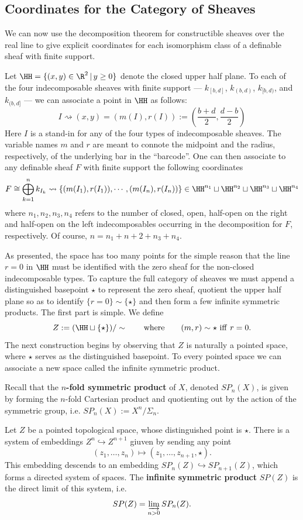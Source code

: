 \subsection{Coordinates for the Category of Sheaves}

We can now use the decomposition theorem for constructible sheaves over the real line to give explicit coordinates for each isomorphism class of a definable sheaf with finite support.

Let $\HH=\{(x,y)\in \R^2 \,|\, y\geq 0 \}$ denote the closed upper half plane. To each of the four indecomposable sheaves with finite support --- $k_{[b,d]}$, $k_{(b,d)}$, $k_{[b,d)}$, and $k_{(b,d]}$ --- we can associate a point in $\HH$ as follows:
\[
I \rightsquigarrow (x,y)=(m(I),r(I)):=(\frac{b+d}{2},\frac{d-b}{2})
\]
Here $I$ is a stand-in for any of the four types of indecomposable sheaves. The variable names $m$ and $r$ are meant to connote the midpoint and the radius, respectively, of the underlying bar in the ``barcode''. One can then associate to any definable sheaf $F$ with finite support the following coordinates
\[
F\cong \bigoplus_{k=1}^n k_{I_k}\rightsquigarrow \{(m(I_1),r(I_1)),\cdots,(m(I_n),r(I_n))\}\in \HH^{n_1} \sqcup \HH^{n_2} \sqcup \HH^{n_3} \sqcup \HH^{n_4}
\]
where $n_1,n_2,n_3,n_4$ refers to the number of closed, open, half-open on the right and half-open on the left indecomposables occurring in the decomposition for $F$, respectively. Of course, $n=n_1+n+2+n_3+n_4$. 

As presented, the space has too many points for the simple reason that the line $r=0$ in $\HH$ must be identified with the zero sheaf for the non-closed indecomposable types. To capture the full category of sheaves we must append a distinguished basepoint $\star$ to represent the zero sheaf, quotient the upper half plane so as to identify $\{r=0\}\sim \{\star\}$ and then form a few infinite symmetric products. The first part is simple. We define
\[
Z:=(\HH\sqcup \{\star\})/\sim \qquad \mathrm{where} \qquad (m,r)\sim \star \,\,\mathrm{iff}\,\, r=0.
\]
The next construction begins by observing that $Z$ is naturally a pointed space, where $\star$ serves as the distinguished basepoint. To every pointed space we can associate a new space called the infinite symmetric product.

\begin{defn}
 Recall that the \textbf{$n$-fold symmetric product} of $X$, denoted $SP_n(X)$, is given by forming the $n$-fold Cartesian product and quotienting out by the action of the symmetric group, i.e. $SP_n(X):=X^n/\Sigma_n$. 

 Let $Z$ be a pointed topological space, whose distinguished point is $\star$. There is a system of embeddings $Z^n\hookrightarrow Z^{n+1}$ giuven by sending any point 
\[
(z_1,\ldots,z_n) \mapsto (z_1,\ldots,z_{n+1},\star).
\] 
This embedding descends to an embedding $SP_n(Z)\hookrightarrow SP_{n+1}(Z)$, which forms a directed system of spaces. The \textbf{infinite symmetric product} $SP(Z)$ is the direct limit of this system, i.e.
\[
SP(Z)=\varinjlim_{n>0}SP_n(Z).
\]
\end{defn}

